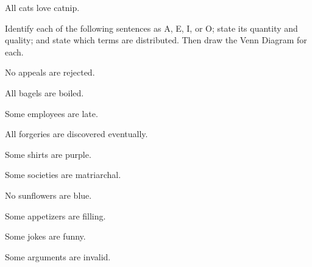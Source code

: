 \begin{exercises}
\item All cats love catnip.


\end{exercises}

\noindent \problempart Identify each of the following sentences as A, E, I, or O; state its quantity and quality; and state which terms are distributed. Then draw the Venn Diagram for each.

\begin{exercises}


\item No appeals are rejected.



\item All bagels are boiled.

\item Some employees are late.

\item All forgeries are discovered eventually.

\item Some shirts are purple.

\item Some societies are matriarchal.

\item No sunflowers are blue.

\item Some appetizers are filling.

\item Some jokes are funny.

\item Some arguments are invalid.

\end{exercises}

